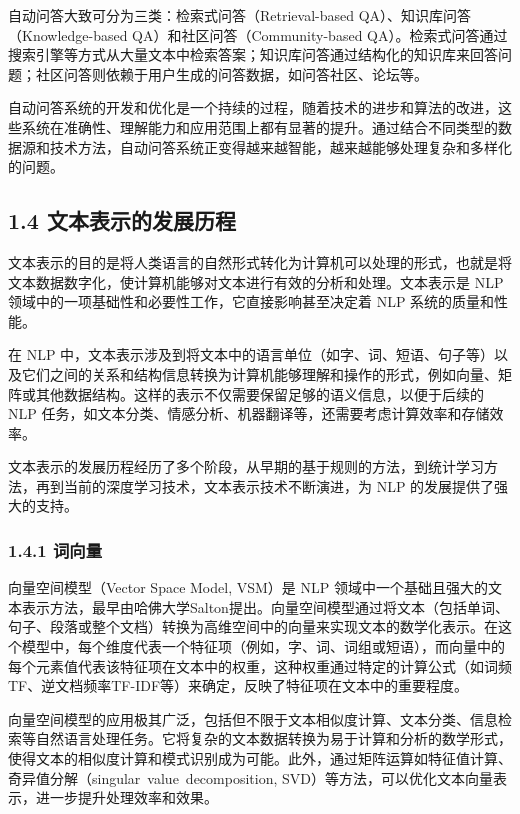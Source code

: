 \documentclass[12pt,a4paper]{book}
\begin{document}
自动问答大致可分为三类：检索式问答（Retrieval-based
QA）、知识库问答（Knowledge-based QA）和社区问答（Community-based
QA）。检索式问答通过搜索引擎等方式从大量文本中检索答案；知识库问答通过结构化的知识库来回答问题；社区问答则依赖于用户生成的问答数据，如问答社区、论坛等。

自动问答系统的开发和优化是一个持续的过程，随着技术的进步和算法的改进，这些系统在准确性、理解能力和应用范围上都有显著的提升。通过结合不同类型的数据源和技术方法，自动问答系统正变得越来越智能，越来越能够处理复杂和多样化的问题。

\subsection{1.4
文本表示的发展历程}\label{ux6587ux672cux8868ux793aux7684ux53d1ux5c55ux5386ux7a0b}

文本表示的目的是将人类语言的自然形式转化为计算机可以处理的形式，也就是将文本数据数字化，使计算机能够对文本进行有效的分析和处理。文本表示是
NLP 领域中的一项基础性和必要性工作，它直接影响甚至决定着 NLP
系统的质量和性能。

在 NLP
中，文本表示涉及到将文本中的语言单位（如字、词、短语、句子等）以及它们之间的关系和结构信息转换为计算机能够理解和操作的形式，例如向量、矩阵或其他数据结构。这样的表示不仅需要保留足够的语义信息，以便于后续的
NLP
任务，如文本分类、情感分析、机器翻译等，还需要考虑计算效率和存储效率。

文本表示的发展历程经历了多个阶段，从早期的基于规则的方法，到统计学习方法，再到当前的深度学习技术，文本表示技术不断演进，为
NLP 的发展提供了强大的支持。

\subsubsection{1.4.1 词向量}\label{ux8bcdux5411ux91cf}

向量空间模型（Vector Space Model, VSM）是 NLP
领域中一个基础且强大的文本表示方法，最早由哈佛大学Salton提出。向量空间模型通过将文本（包括单词、句子、段落或整个文档）转换为高维空间中的向量来实现文本的数学化表示。在这个模型中，每个维度代表一个特征项（例如，字、词、词组或短语），而向量中的每个元素值代表该特征项在文本中的权重，这种权重通过特定的计算公式（如词频TF、逆文档频率TF-IDF等）来确定，反映了特征项在文本中的重要程度。

向量空间模型的应用极其广泛，包括但不限于文本相似度计算、文本分类、信息检索等自然语言处理任务。它将复杂的文本数据转换为易于计算和分析的数学形式，使得文本的相似度计算和模式识别成为可能。此外，通过矩阵运算如特征值计算、奇异值分解（singular~value~decomposition,
SVD）等方法，可以优化文本向量表示，进一步提升处理效率和效果。
\end{document}

